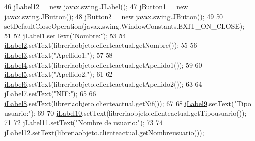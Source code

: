 \begin{DoxyCode}
46         \mbox{\hyperlink{class_interfaz_package_1_1_informacion_cliente_ae99ca6a6dc9eb57f924b11c625ab6209}{jLabel12}} = \textcolor{keyword}{new} javax.swing.JLabel();
47         \mbox{\hyperlink{class_interfaz_package_1_1_informacion_cliente_aa7c801b9c192b73cd1b5a0d73a3a7de3}{jButton1}} = \textcolor{keyword}{new} javax.swing.JButton();
48         \mbox{\hyperlink{class_interfaz_package_1_1_informacion_cliente_a18ab6870a03adb8b530c00f93ff9656b}{jButton2}} = \textcolor{keyword}{new} javax.swing.JButton();
49 
50         setDefaultCloseOperation(javax.swing.WindowConstants.EXIT\_ON\_CLOSE);
51 
52         \mbox{\hyperlink{class_interfaz_package_1_1_informacion_cliente_a76d63040cd29ebdaf61bb51a1f748393}{jLabel1}}.setText(\textcolor{stringliteral}{"Nombre:"});
53 
54         \mbox{\hyperlink{class_interfaz_package_1_1_informacion_cliente_a1ff1b1422342b4b51d17fb166ec625ff}{jLabel2}}.setText(libreriaobjeto.clienteactual.getNombre());
55 
56         \mbox{\hyperlink{class_interfaz_package_1_1_informacion_cliente_affc4d391ce9a4a138bb4ea1fc2fc23ec}{jLabel3}}.setText(\textcolor{stringliteral}{"Apellido1:"});
57 
58         \mbox{\hyperlink{class_interfaz_package_1_1_informacion_cliente_aa0124c463f35b5a5caaf6987b4329799}{jLabel4}}.setText(libreriaobjeto.clienteactual.getApellido1());
59 
60         \mbox{\hyperlink{class_interfaz_package_1_1_informacion_cliente_a12ceb5a1b4c467dfa98d98325d8ef848}{jLabel5}}.setText(\textcolor{stringliteral}{"Apellido2:"});
61 
62         \mbox{\hyperlink{class_interfaz_package_1_1_informacion_cliente_a821aa89fbcb7dfaebf2fadaa9afe79e6}{jLabel6}}.setText(libreriaobjeto.clienteactual.getApellido2());
63 
64         \mbox{\hyperlink{class_interfaz_package_1_1_informacion_cliente_a43ed96cf07f28a71b91c6825e13023c3}{jLabel7}}.setText(\textcolor{stringliteral}{"NIF:"});
65 
66         \mbox{\hyperlink{class_interfaz_package_1_1_informacion_cliente_acafa312ca1d5f92c4d3f969e1879289b}{jLabel8}}.setText(libreriaobjeto.clienteactual.getNif());
67 
68         \mbox{\hyperlink{class_interfaz_package_1_1_informacion_cliente_a03808e144608db738a13ec9eaa6d5559}{jLabel9}}.setText(\textcolor{stringliteral}{"Tipo usuario:"});
69 
70         \mbox{\hyperlink{class_interfaz_package_1_1_informacion_cliente_af5593b23fec083a2c1f0cfccfb17b2ad}{jLabel10}}.setText(libreriaobjeto.clienteactual.getTipousuario());
71 
72         \mbox{\hyperlink{class_interfaz_package_1_1_informacion_cliente_a31fbf3562a8a9f5df8d2b5b19f2f9f76}{jLabel11}}.setText(\textcolor{stringliteral}{"Nombre de usuario:"});
73 
74         \mbox{\hyperlink{class_interfaz_package_1_1_informacion_cliente_ae99ca6a6dc9eb57f924b11c625ab6209}{jLabel12}}.setText(libreriaobjeto.clienteactual.getNombreusuario());

\end{DoxyCode}

